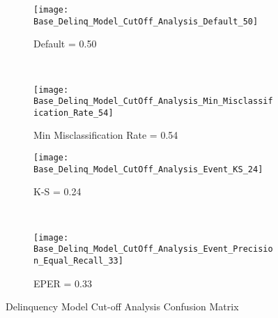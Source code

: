 \begin{figure}[H]
	\centering
	\begin{subfigure}[b]{0.45\textwidth}
		\captionsetup{font=scriptsize}
		\texttt{[image: Base\_Delinq\_Model\_CutOff\_Analysis\_Default\_50]}\caption{Default = 0.50}\label{fig:Base_Delinq_Model_CutOff_Analysis_Default_50}
	\end{subfigure}  ~\quad
	\begin{subfigure}[b]{0.45\textwidth}
		\captionsetup{font=scriptsize}
		\texttt{[image: Base\_Delinq\_Model\_CutOff\_Analysis\_Min\_Misclassification\_Rate\_54]}
		\caption{Min Misclassification Rate = 0.54}\label{fig:Base_Delinq_Model_CutOff_Analysis_Min_Misclassification_Rate_54}
	\end{subfigure} 
	\medskip \newline
	\begin{subfigure}[b]{0.45\textwidth}
		\captionsetup{font=scriptsize}
		\texttt{[image: Base\_Delinq\_Model\_CutOff\_Analysis\_Event\_KS\_24]}
		\caption{K-S = 0.24}\label{fig:Base_Delinq_Model_CutOff_Analysis_Event_KS_24}
	\end{subfigure} ~\quad
	\begin{subfigure}[b]{0.45\textwidth}
		\captionsetup{font=scriptsize}
		\texttt{[image: Base\_Delinq\_Model\_CutOff\_Analysis\_Event\_Precision\_Equal\_Recall\_33]}
		\caption{EPER = 0.33}\label{fig:Base_Delinq_Model_CutOff_Analysis_Event_Precision_Equal_Recall_33}
	\end{subfigure}
	\caption{Delinquency Model Cut-off Analysis Confusion Matrix}
	\label{fig:Base_Delinq_Model_CutOff_Analysis_Event_Precision_Equal_Recall_33}
\end{figure}

